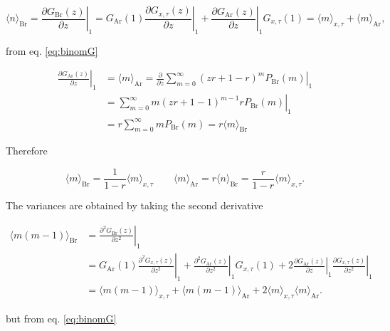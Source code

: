 \begin{equation*}
  \langle n\rangle_\text{Br} = \left.\frac{\partial G_\text{Br}(z)}{\partial z}\right|_1 = G_\text{Ar}(1)\left.\frac{\partial G_{x,\tau}(z)}{\partial z}\right|_1 + \left.\frac{\partial G_\text{Ar}(z)}{\partial z}\right|_1G_{x,\tau}(1) = \langle m\rangle_{x,\tau} + \langle m\rangle_\text{Ar},
\end{equation*}

from eq. \ref{eq:binomG} 

\begin{equation*}
  \begin{split}
  \left.\frac{\partial G_\text{Ar}(z)}{\partial z}\right|_1 &= \langle m\rangle_\text{Ar} = \left.\frac{\partial}{\partial z} \sum_{m=0}^\infty(zr+1-r)^mP_\text{Br}(m)\right|_1\\
&= \left.\sum_{m=0}^\infty m(zr+1-1)^{m-1}rP_\text{Br}(m)\right|_1\\
&= r\sum_{m=0}^\infty mP_\text{Br}(m) = r\langle m\rangle_\text{Br}
  \end{split}
\end{equation*}
  
Therefore

\begin{equation}
  \label{eq:aveBrAr}
  \langle m\rangle_\text{Br} = \frac{1}{1-r}\langle m\rangle_{x,\tau}\quad\quad \langle m\rangle_\text{Ar} = r\langle n\rangle_\text{Br} = \frac{r}{1-r}\langle m\rangle_{x,\tau}.
\end{equation}

The variances are obtained by taking the second derivative

\begin{equation}
  \label{eq:2Br}
  \begin{split}
    \langle m(m-1)\rangle_\text{Br} &= \left.\frac{\partial^2 G_\text{Br}(z)}{\partial z^2}\right|_1\\
    &=G_\text{Ar}(1)\left.\frac{\partial^2 G_{x,\tau}(z)}{\partial z^2}\right|_1 + \left.\frac{\partial^2 G_\text{Ar}(z)}{\partial z^2}\right|_1G_{x,\tau}(1) + 2\left.\frac{\partial G_\text{Ar}(z)}{\partial z}\right|_1\left.\frac{\partial G_{x,\tau}(z)}{\partial z^2}\right|_1\\
    &=\langle m(m-1)\rangle_{x,\tau}+\langle m(m-1)\rangle_\text{Ar}+2\langle m\rangle_{x,\tau}\langle m\rangle_\text{Ar}.
  \end{split}
\end{equation}

but from eq. \ref{eq:binomG}

